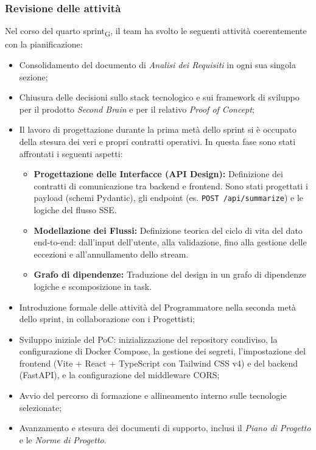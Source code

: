 ﻿\documentclass[a4paper, 10pt, colorlinks=true, linkcolor=black, urlcolor=blue, citecolor=blue, hidelinks]{article}
\begin{document}
\subsubsection{Revisione delle attività}
Nel corso del quarto sprint\textsubscript{G}, il team ha svolto le seguenti attività coerentemente con la pianificazione:
\begin{itemize}
    \item Consolidamento del documento di \textit{Analisi dei Requisiti} in ogni sua singola sezione;
    \item Chiusura delle decisioni sullo stack tecnologico e sui framework di sviluppo per il prodotto \textit{Second Brain} e per il relativo \textit{Proof of Concept};
    \item Il lavoro di progettazione durante la prima metà dello sprint si è occupato della stesura dei veri e propri contratti operativi. In questa fase sono stati affrontati i seguenti aspetti:
    \begin{itemize}
        \item \textbf{Progettazione delle Interfacce (API Design):} Definizione dei contratti di comunicazione tra backend e frontend. Sono stati progettati i payload (schemi Pydantic), gli endpoint (es. \texttt{POST /api/summarize}) e le logiche del flusso SSE.
        \item \textbf{Modellazione dei Flussi:} Definizione teorica del ciclo di vita del dato end-to-end: dall'input dell'utente, alla validazione, fino alla gestione delle eccezioni e all'annullamento dello stream.
        \item \textbf{Grafo di dipendenze:} Traduzione del design in un grafo di dipendenze logiche e scomposizione in task.
    \end{itemize}
    \item Introduzione formale delle attività del Programmatore nella seconda metà dello sprint, in collaborazione con i Progettisti;
    \item Sviluppo iniziale del PoC: inizializzazione del repository condiviso, la configurazione di Docker Compose, la gestione dei segreti, l'impostazione del frontend (Vite + React + TypeScript con Tailwind CSS v4) e del backend (FastAPI), e la configurazione del middleware CORS;
    \item Avvio del percorso di formazione e allineamento interno sulle tecnologie selezionate;
    \item Avanzamento e stesura dei documenti di supporto, inclusi il \textit{Piano di Progetto} e le \textit{Norme di Progetto}.
\end{itemize}
\end{document}
